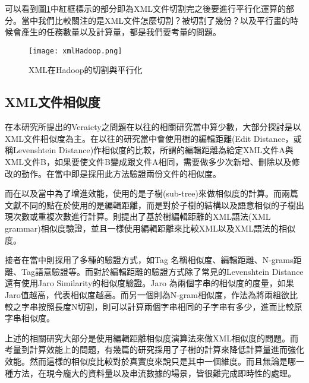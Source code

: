 可以看到圖\ref{xmlhadoop}中紅框標示的部分即為XML文件切割完之後要進行平行化運算的部分。當中我們比較關注的是XML文件怎麼切割？被切割了幾份？以及平行畫的時候會產生的任務數量以及計算量，都是我們要考量的問題。

\begin{figure}[H]
\centering
\graphicspath{{/Users/FUDA/Documents/masterThesis/image/}}
\texttt{[image: xmlHadoop.png]}
\caption{XML在Hadoop的切割與平行化}
\label{xmlhadoop}
\end{figure}

\subsection{XML文件相似度}
在本研究所提出的Veraicty之問題在以往的相關研究當中算少數，大部分探討是以XML文件相似度為主。在以往的研究當中會使用樹的編輯距離\cite{bille2005survey}(Edit Distance，或稱Levenshtein Distance)作相似度的比較，所謂的編輯距離為給定XML文件A與XML文件B，如果要使文件B變成跟文件A相同，需要做多少次新增、刪除以及修改的動作。在\cite{tai1979tree}當中即是採用此方法驗證兩份文件的相似度。\\\par
而在\cite{tekli2006semantic}以及\cite{tekli2012novel}當中為了增進效能，使用的是子樹(sub-tree)來做相似度的計算。而兩篇文獻不同的點在於\cite{tekli2006semantic}使用的是編輯距離，而\cite{tekli2012novel}是對於子樹的結構以及語意相似的子樹出現次數或重複次數進行計算。\cite{tekli2015approximate}則提出了基於樹編輯距離的XML語法(XML grammar)相似度驗證，並且一樣使用編輯距離來比較XML以及XML語法的相似度。\\\par
接者在\cite{algergawy2010element}當中則採用了多種的驗證方式，如Tag 名稱相似度、編輯距離、N-grams距離、Tag語意驗證等。而對於編輯距離的驗證方式除了常見的Levenshtein Distance還有使用Jaro Similarity的相似度驗證。Jaro 為兩個字串的相似度的度量，如果Jaro值越高，代表相似度越高。而另一個則為N-gram相似度，作法為將兩組欲比較之字串按照長度N切割，則可以計算兩個字串相同的子字串有多少，進而比較原字串相似度。\\\par
上述的相關研究大部分是使用編輯距離相似度演算法來做XML相似度的問題。而考量到計算效能上的問題，有幾篇的研究採用了子樹的計算來降低計算量進而強化效能。然而這樣的相似度比較對於真實度來說只是其中一個維度。而且無論是哪一種方法，在現今龐大的資料量以及串流數據的場景，皆很難完成即時性的處理。

\newpage